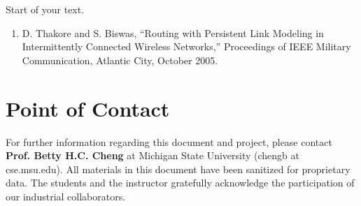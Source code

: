 \documentclass[12pt]{article}
\begin{document}
Start of your text.

\begin{enumerate}
\def\labelenumi{\arabic{enumi}.}
\item
  D. Thakore and S. Biswas, ``Routing with Persistent Link Modeling in
  Intermittently Connected Wireless Networks,'' Proceedings of IEEE
  Military Communication, Atlantic City, October 2005.
\end{enumerate}

\section{Point of Contact}\label{point-of-contact}

For further information regarding this document and project, please
contact \textbf{Prof. Betty H.C. Cheng} at Michigan State University
(chengb at cse.msu.edu). All materials in this document have been
sanitized for proprietary data. The students and the instructor
gratefully acknowledge the participation of our industrial
collaborators.

\printbibliography
\end{document}
